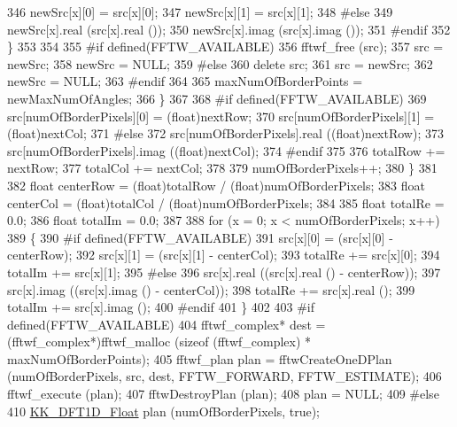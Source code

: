 \begin{DoxyCode}
346           newSrc[x][0] = src[x][0];
347           newSrc[x][1] = src[x][1];
348 \textcolor{preprocessor}{        #else}
349           newSrc[x].real (src[x].real ());
350           newSrc[x].imag (src[x].imag ());
351 \textcolor{preprocessor}{        #endif}
352       \}
353 
354 
355 \textcolor{preprocessor}{      #if  defined(FFTW\_AVAILABLE)}
356         fftwf\_free (src);
357         src = newSrc;
358         newSrc = NULL;
359 \textcolor{preprocessor}{      #else}
360         \textcolor{keyword}{delete}  src;
361         src = newSrc;
362         newSrc = NULL;
363 \textcolor{preprocessor}{      #endif}
364 
365       maxNumOfBorderPoints = newMaxNumOfAngles;
366     \}
367 
368 \textcolor{preprocessor}{    #if  defined(FFTW\_AVAILABLE)}
369       src[numOfBorderPixels][0] = (float)nextRow;
370       src[numOfBorderPixels][1] = (float)nextCol;
371 \textcolor{preprocessor}{    #else}
372       src[numOfBorderPixels].real ((\textcolor{keywordtype}{float})nextRow);
373       src[numOfBorderPixels].imag ((\textcolor{keywordtype}{float})nextCol);
374 \textcolor{preprocessor}{    #endif}
375 
376     totalRow += nextRow;
377     totalCol += nextCol;
378 
379     numOfBorderPixels++;
380   \}
381 
382   \textcolor{keywordtype}{float}  centerRow = (float)totalRow / (\textcolor{keywordtype}{float})numOfBorderPixels;
383   \textcolor{keywordtype}{float}  centerCol = (float)totalCol / (\textcolor{keywordtype}{float})numOfBorderPixels;
384 
385   \textcolor{keywordtype}{float}  totalRe = 0.0;
386   \textcolor{keywordtype}{float}  totalIm = 0.0;
387 
388   \textcolor{keywordflow}{for}  (x = 0;  x < numOfBorderPixels;  x++)
389   \{
390 \textcolor{preprocessor}{    #if  defined(FFTW\_AVAILABLE)}
391       src[x][0] = (src[x][0] - centerRow);
392       src[x][1] = (src[x][1] - centerCol);
393       totalRe += src[x][0];
394       totalIm += src[x][1];
395 \textcolor{preprocessor}{    #else}
396       src[x].real ((src[x].real () - centerRow));
397       src[x].imag ((src[x].imag () - centerCol));
398       totalRe += src[x].real ();
399       totalIm += src[x].imag ();
400 \textcolor{preprocessor}{    #endif}
401   \}
402 
403 \textcolor{preprocessor}{  #if  defined(FFTW\_AVAILABLE)}
404     fftwf\_complex*  dest = (fftwf\_complex*)fftwf\_malloc (\textcolor{keyword}{sizeof} (fftwf\_complex) * maxNumOfBorderPoints);
405     fftwf\_plan plan = fftwCreateOneDPlan (numOfBorderPixels, src, dest, FFTW\_FORWARD, FFTW\_ESTIMATE);
406     fftwf\_execute (plan);
407     fftwDestroyPlan (plan);
408     plan = NULL;
409 \textcolor{preprocessor}{  #else}
410     \hyperlink{class_k_k_b_1_1_k_k___d_f_t1_d}{KK\_DFT1D\_Float}  plan (numOfBorderPixels, \textcolor{keyword}{true});

\end{DoxyCode}
